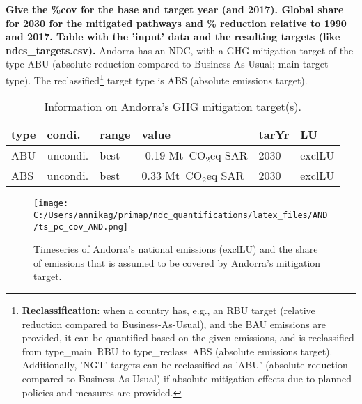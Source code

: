\documentclass[12pt]{article}
\begin{document}
 \textbf{ 
 Give the \%cov for the base and target year (and 2017).
 Global share for 2030 for the mitigated pathways and \% reduction relative to 1990 and 2017.
 Table with the 'input' data and the resulting targets (like ndcs\_targets.csv).}
 Andorra has an NDC, with a GHG mitigation target of the type ABU (absolute reduction compared to Business-As-Usual; main target type).
 The reclassified\footnote{\textbf{Reclassification}: when a country has, e.g., an RBU target (relative reduction compared to Business-As-Usual), and the BAU emissions are provided, it can be quantified based on the given emissions, and is reclassified from type\_main~RBU to type\_reclass~ABS (absolute emissions target).
 Additionally, 'NGT' targets can be reclassified as 'ABU' (absolute reduction compared to Business-As-Usual) if absolute mitigation effects due to planned policies and measures are provided.}  target type is ABS (absolute emissions target).
 \begin{table}[htbp]
 \centering
 \caption{Information on Andorra's GHG mitigation target(s).}
 \label{tab:mitiTars}
 \begin{tabular}{l l l l l l }
 \bfseries type & \bfseries condi. & \bfseries range & \bfseries value & \bfseries tarYr & \bfseries LU \tabularnewline \hline
 ABU & uncondi. & best & -0.19 Mt~CO$_2$eq SAR & 2030 & exclLU \tabularnewline 
 ABS & uncondi. & best & 0.33 Mt~CO$_2$eq SAR & 2030 & exclLU \tabularnewline 
 \end{tabular}
 \end{table}
 \begin{figure}[htbp]
 \centering
 \texttt{[image: C:/Users/annikag/primap/ndc\_quantifications/latex\_files/AND/ts\_pc\_cov\_AND.png]}
 \caption{Timeseries of Andorra's national emissions (exclLU) and the share of emissions that is assumed to be covered by Andorra's mitigation target.}
 \label{fig:tsPcCov}
 \end{figure}
\end{document}
